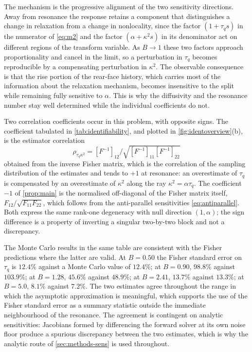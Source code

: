 \documentclass[preprint,12pt,a4paper]{elsarticle}
\theoremstyle{plain}
\theoremstyle{definition}
\theoremstyle{remark}
\newcommand{\tq}{\tau_{q}}
\newcommand{\kk}{\kappa^{2}}
\newcommand{\Bnum}{B}
\begin{document}
The mechanism is the progressive alignment of the two sensitivity directions.
Away from resonance the response retains a component that distinguishes a change
in relaxation from a change in nonlocality, since the factor $(1+\tq s)$ in the
numerator of \eqref{eq:m2} and the factor $(\alpha+\kk s)$ in its denominator
act on different regions of the transform variable. As $\Bnum \to 1$ these two
factors approach proportionality and cancel in the limit, so a perturbation in
$\tq$ becomes reproducible by a compensating perturbation in $\kk$. The
observable consequence is that the rise portion of the rear-face history, which
carries most of the information about the relaxation mechanism, becomes
insensitive to the split while remaining fully sensitive to $\alpha$. This is
why the diffusivity and the resonance number stay well determined while the
individual coefficients do not.

Two correlation coefficients occur in this problem, with opposite signs. The
coefficient tabulated in
\cref{tab:identifiability}, and plotted in \cref{fig:identoverview}(b), is the
estimator correlation
\[
  \rho_{\tq\kk} = [F^{-1}]_{12}\big/\sqrt{[F^{-1}]_{11}[F^{-1}]_{22}}
\]
obtained from
the inverse Fisher matrix, which is the correlation of the sampling
distribution of the estimates and tends to $+1$ at resonance: an
overestimate of $\tq$ is compensated by an overestimate of $\kk$ along the ray
$\kk=\alpha\tq$. The coefficient $-1$ of \cref{prop:main} is the normalised
off-diagonal of the Fisher matrix itself,
$F_{12}/\sqrt{F_{11}F_{22}}$, which follows from the anti-parallel
sensitivities \eqref{eq:antiparallel}. Both express the same rank-one
degeneracy with null direction $(1,\alpha)$; the sign difference is a property
of inverting a singular two-by-two block and not a discrepancy.


The Monte Carlo results in the same table are consistent with the Fisher
predictions where the latter are valid. At $\Bnum = 0.50$ the Fisher standard error on $\tq$ is
$12.4\%$ against a Monte Carlo value of $12.4\%$; at $\Bnum = 0.90$, $98.8\%$
against $103.9\%$; at $\Bnum = 1.28$, $45.6\%$ against $48.9\%$; at
$\Bnum = 2.41$, $13.7\%$ against $13.3\%$; at $\Bnum = 5.0$, $8.1\%$ against
$7.2\%$. The two estimates agree throughout the range in which the asymptotic
approximation is meaningful, which supports the use of the Fisher standard
error as a summary statistic outside the immediate neighbourhood of the
resonance. The agreement is contingent on analytic sensitivities: Jacobians
formed by differencing the forward solver at its own noise floor produce a
spurious discrepancy between the two estimates, which is why the analytic route
of \cref{sec:methods-sens} is used throughout.
\end{document}
